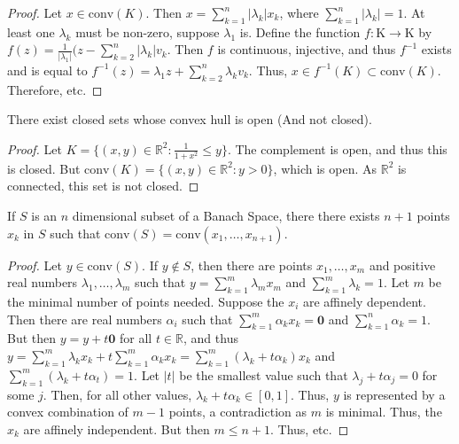         \begin{proof}
        Let $x\in \textrm{conv}(K)$. Then $x=\sum_{k=1}^{n}|\lambda_k| x_k$, where $\sum_{k=1}^{n}|\lambda_k| = 1$. At least one $\lambda_k$ must be non-zero, suppose $\lambda_1$ is. Define the function $f:\textrm{K}\rightarrow \textrm{K}$ by $f(z) = \frac{1}{|\lambda_1|}(z-\sum_{k=2}^{n}|\lambda_k|v_k$. Then $f$ is continuous, injective, and thus $f^{-1}$ exists and is equal to $f^{-1}(z) = \lambda_1 z +\sum_{k=2}^{n}\lambda_k v_k$. Thus, $x\in f^{-1}(K)\subset\textrm{conv}(K)$. Therefore, etc. 
        \end{proof}
        \begin{theorem}
        There exist closed sets whose convex hull is open (And not closed).
        \end{theorem}
        \begin{proof}
        Let $K = \{(x,y)\in \mathbb{R}^2:\frac{1}{1+x^2}\leq y\}$. The complement is open, and thus this is closed. But $\textrm{conv}(K) = \{(x,y)\in \mathbb{R}^2:y>0\}$, which is open. As $\mathbb{R}^2$ is connected, this set is not closed.
        \end{proof}
        \begin{theorem}
        If $S$ is an $n$ dimensional subset of a Banach Space, there there exists $n+1$ points $x_k$ in $S$ such that $\textrm{conv}(S) = \textrm{conv}(x_1,\hdots, x_{n+1})$.
        \end{theorem}
        \begin{proof}
        Let $y\in \textrm{conv}(S)$. If $y\notin S$, then there are points $x_1,\hdots, x_m$ and positive real numbers $\lambda_1,\hdots, \lambda_m$ such that $y=\sum_{k=1}^{m}\lambda_m x_m$ and $\sum_{k=1}^{m}\lambda_k = 1$. Let $m$ be the minimal number of points needed. Suppose the $x_i$ are affinely dependent. Then there are real numbers $\alpha_i$ such that $\sum_{k=1}^{m}\alpha_k x_k = \mathbf{0}$ and $\sum_{k=1}^{n}\alpha_k =1$. But then $y = y+t\mathbf{0}$ for all $t\in \mathbb{R}$, and thus $y = \sum_{k=1}^{m}\lambda_k x_k + t\sum_{k=1}^{m}\alpha_k x_k = \sum_{k=1}^{m}(\lambda_k + t\alpha_k)x_k$ and $\sum_{k=1}^{m}(\lambda_k+t\alpha_t) = 1$. Let $|t|$ be the smallest value such that $\lambda_j + t\alpha_j = 0$ for some $j$. Then, for all other values, $\lambda_k + t\alpha_k \in [0,1]$. Thus, $y$ is represented by a convex combination of $m-1$ points, a contradiction as $m$ is minimal. Thus, the $x_k$ are affinely independent. But then $m \leq n+1$. Thus, etc.
        \end{proof}
